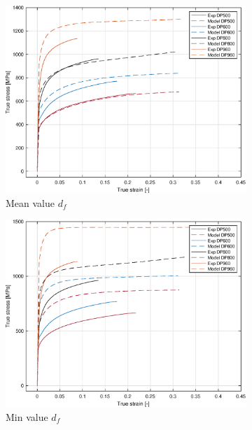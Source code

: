 \documentclass{article}
\begin{document}
\begin{figure}[h!]
     \centering
     \begin{subfigure}[b]{0.3\textwidth}
         \centering
         \includegraphics[width=\textwidth]{MeanMean.eps}
         \caption{Mean value $d_f$}
         \label{fig:Mean}
     \end{subfigure}
     \hfill
     \begin{subfigure}[b]{0.3\textwidth}
         \centering
         \includegraphics[width=\textwidth]{GrainMin.eps}
         \caption{Min value $d_f$}
         \label{fig:GrainMin}
     \end{subfigure}
          \hfill
     \begin{subfigure}[b]{0.3\textwidth}

\end{subfigure}
\end{figure}
\end{document}
